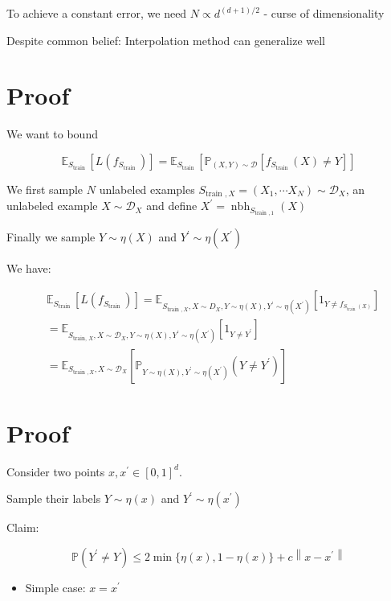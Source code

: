 To achieve a constant error, we need $N \propto d^{(d+1) / 2}$ - curse of dimensionality

Despite common belief: Interpolation method can generalize well

\section*{Proof}
We want to bound

$$
\mathbb{E}_{S_{\text {train }}}\left[L\left(f_{S_{\text {train }}}\right)\right]=\mathbb{E}_{S_{\text {train }}}\left[\mathbb{P}_{(X, Y) \sim \mathscr{D}}\left[f_{S_{\text {train }}}(X) \neq Y\right]\right]
$$

We first sample $N$ unlabeled examples $S_{\text {train }, X}=\left(X_{1}, \cdots X_{N}\right) \sim \mathscr{D}_{X}$, an unlabeled example $X \sim \mathscr{D}_{X}$ and define $X^{\prime}=\operatorname{nbh}_{S_{\text {train }, 1}}(X)$

Finally we sample $Y \sim \eta(X)$ and $Y^{\prime} \sim \eta\left(X^{\prime}\right)$

We have:

$$
\begin{aligned}
& \mathbb{E}_{S_{\text {train }}}\left[L\left(f_{S_{\text {train }}}\right)\right]=\mathbb{E}_{S_{\text {train }, X}, X \sim D_{X}, Y \sim \eta(X), Y^{\prime} \sim \eta\left(X^{\prime}\right)}\left[1_{Y \neq f_{S_{\text {train }}(X)}}\right] \\
& =\mathbb{E}_{S_{\text {train, } X}, X \sim \mathscr{D}_{X}, Y \sim \eta(X), Y^{\prime} \sim \eta\left(X^{\prime}\right)}\left[1_{Y \neq Y^{\prime}}\right] \\
& =\mathbb{E}_{S_{\text {train }, X}, X \sim \mathscr{D}_{X}}\left[\mathbb{P}_{Y \sim \eta(X), Y^{\prime} \sim \eta\left(X^{\prime}\right)}\left(Y \neq Y^{\prime}\right)\right]
\end{aligned}
$$

\section*{Proof}
Consider two points $x, x^{\prime} \in[0,1]^{d}$.

Sample their labels $Y \sim \eta(x)$ and $Y^{\prime} \sim \eta\left(x^{\prime}\right)$

Claim:

$$
\mathbb{P}\left(Y^{\prime} \neq Y\right) \leq 2 \min \{\eta(x), 1-\eta(x)\}+c\left\|x-x^{\prime}\right\|
$$

\begin{itemize}
  \item Simple case: $x=x^{\prime}$
\end{itemize}

